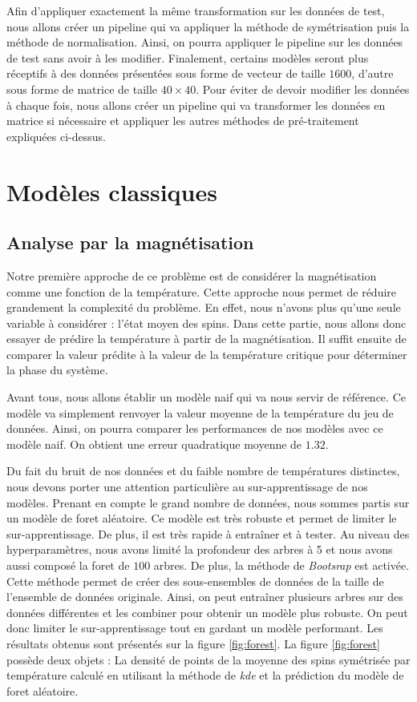 \documentclass[11pt, parskip=half]{scrartcl} %
\begin{document}
Afin d'appliquer exactement la même transformation sur les données de test, nous allons créer un pipeline qui va appliquer la méthode de symétrisation puis la méthode de normalisation. Ainsi, on pourra appliquer le pipeline sur les données de test sans avoir à les modifier.
Finalement, certains modèles seront plus réceptifs à des données présentées sous forme de vecteur de taille $1600$, d'autre sous forme de matrice de taille $40 \times 40$. Pour éviter de devoir modifier les données à chaque fois, nous allons créer un pipeline qui va transformer les données en matrice si nécessaire et appliquer les autres méthodes de pré-traitement expliquées ci-dessus.

\section{Modèles classiques}

\subsection{Analyse par la magnétisation}
Notre première approche de ce problème est de considérer la magnétisation comme une fonction de la température. Cette approche nous permet de réduire grandement la complexité du problème. En effet, nous n'avons plus qu'une seule variable à considérer : l'état moyen des spins. Dans cette partie, nous allons donc essayer de prédire la température à partir de la magnétisation. Il suffit ensuite de comparer la valeur prédite à la valeur de la température critique pour déterminer la phase du système.

Avant tous, nous allons établir un modèle naif qui va nous servir de référence. Ce modèle va simplement renvoyer la valeur moyenne de la température du jeu de données. Ainsi, on pourra comparer les performances de nos modèles avec ce modèle naif. On obtient une erreur quadratique moyenne de $1.32$.

Du fait du bruit de nos données et du faible nombre de températures distinctes, nous devons porter une attention particulière au sur-apprentissage de nos modèles.
Prenant en compte le grand nombre de données, nous sommes partis sur un modèle de foret aléatoire. Ce modèle est très robuste et permet de limiter le sur-apprentissage. De plus, il est très rapide à entraîner et à tester.
Au niveau des hyperparamètres, nous avons limité la profondeur des arbres à 5 et nous avons aussi composé la foret de $100$ arbres. De plus, la méthode de \textit{Bootsrap} est activée. Cette méthode permet de créer des sous-ensembles de données de la taille de l'ensemble de données originale. Ainsi, on peut entraîner plusieurs arbres sur des données différentes et les combiner pour obtenir un modèle plus robuste.
On peut donc limiter le sur-apprentissage tout en gardant un modèle performant. Les résultats obtenus sont présentés sur la figure \ref{fig:forest}.
La figure \ref{fig:forest} possède deux objets : La densité de points de la moyenne des spins symétrisée par température calculé en utilisant la méthode de \textit{kde} et la prédiction du modèle de foret aléatoire.
\end{document}
